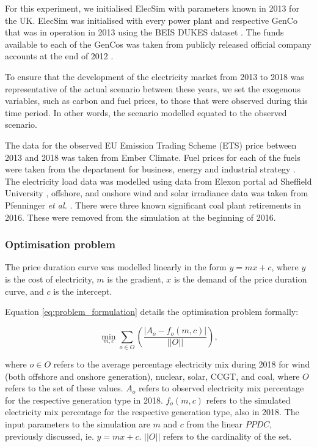 For this experiment, we initialised ElecSim with parameters known in 2013 for the UK. ElecSim was initialised with every power plant and respective GenCo that was in operation in 2013 using the BEIS DUKES dataset \cite{dukes_511}. The funds available to each of the GenCos was taken from publicly released official company accounts at the end of 2012 \cite{companies_house}.

To ensure that the development of the electricity market from 2013 to 2018 was representative of the actual scenario between these years, we set the exogenous variables, such as carbon and fuel prices, to those that were observed during this time period. In other words, the scenario modelled equated to the observed scenario. 

The data for the observed EU Emission Trading Scheme (ETS) price between 2013 and 2018 was taken from Ember Climate\cite{eu-ets}. Fuel prices for each of the fuels were taken from the department for business, energy and industrial strategy \cite{beis_fuel_price}. The electricity load data was modelled using data from Elexon portal ad Sheffield University \cite{gbnationalgridstatus2019}, offshore, and onshore wind and solar irradiance data was taken from Pfenninger \textit{et al.} \cite{Pfenninger2016}. There were three known significant coal plant retirements in 2016. These were removed from the simulation at the beginning of 2016.



\subsubsection{Optimisation problem}
\label{ssec:optimisation-problem}

The price duration curve was modelled linearly in the form $y=mx+c$, where $y$ is the cost of electricity, $m$ is the gradient, $x$ is the demand of the price duration curve, and $c$ is the intercept.

Equation \ref{eq:problem_formulation} details the optimisation problem formally:

\begin{equation}
\label{eq:problem_formulation}
\min_{m,c} \sum\limits_{o\in O}\left(
\frac{\left|A_o-f_o(m,c)\right|}
{\left|\left|O\right|\right|}
\right),
\end{equation}

\noindent where $o\in O$ refers to the average percentage electricity mix during 2018 for wind (both offshore and onshore generation), nuclear, solar, CCGT, and coal, where $O$ refers to the set of these values. $A_o$ refers to observed electricity mix percentage for the respective generation type in 2018. $f_o(m,c)$ refers to the simulated electricity mix percentage for the respective generation type, also in 2018. The input parameters to the simulation are $m$ and $c$ from the linear $PPDC$, previously discussed, ie. $y=mx+c$. $\left|\left|O\right|\right|$ refers to the cardinality of the set.



